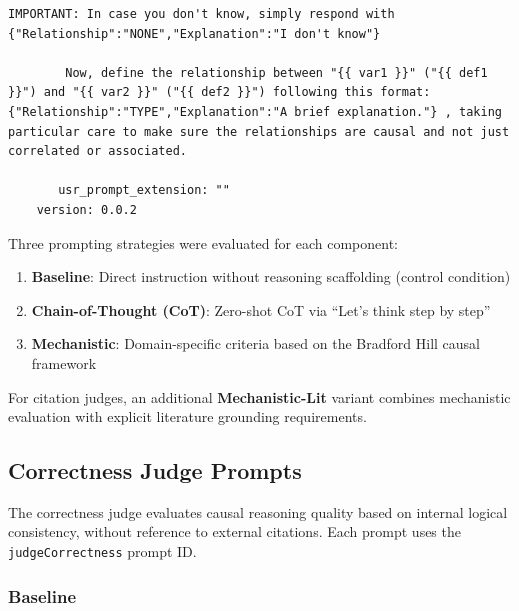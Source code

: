 \begin{lstlisting}[caption={Generator Prompt Configuration: Nitai\_C (\texttt{generateNodes} + \texttt{generateEdges})},label={lst:generator_nitai_c_yaml}]
        IMPORTANT: In case you don't know, simply respond with {"Relationship":"NONE","Explanation":"I don't know"}
        
        Now, define the relationship between "{{ var1 }}" ("{{ def1 }}") and "{{ var2 }}" ("{{ def2 }}") following this format: {"Relationship":"TYPE","Explanation":"A brief explanation."} , taking particular care to make sure the relationships are causal and not just correlated or associated.

       usr_prompt_extension: ""
    version: 0.0.2
\end{lstlisting}

Three prompting strategies were evaluated for each component:
\begin{enumerate}[noitemsep]
    \item \textbf{Baseline}: Direct instruction without reasoning scaffolding (control condition)
    \item \textbf{Chain-of-Thought (CoT)}: Zero-shot CoT via ``Let's think step by step''~\citep{kojima2022large}
    \item \textbf{Mechanistic}: Domain-specific criteria based on the Bradford Hill causal framework~\citep{shimonovich2020bradford}
\end{enumerate}

For citation judges, an additional \textbf{Mechanistic-Lit} variant combines mechanistic evaluation with explicit literature grounding requirements.

\subsection{Correctness Judge Prompts}
\label{sec:correctness_prompts}

The correctness judge evaluates causal reasoning quality based on internal logical consistency, without reference to external citations. Each prompt uses the \texttt{judgeCorrectness} prompt ID.

\subsubsection{Baseline}

